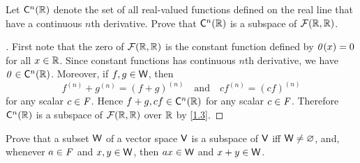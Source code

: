 \setcounter{ex}{15}
\begin{ex}\label{ex:1.3.16}
  Let \(\cfs[n](\R)\) denote the set of all real-valued functions defined on the real line that have a continuous \(n\)th derivative.
  Prove that \(\cfs[n](\R)\) is a subspace of \(\mathcal{F}(\mathbb{R}, \mathbb{R})\).
\end{ex}

\begin{proof}[]
  First note that the zero of \(\mathcal{F}(\mathbb{R}, \mathbb{R})\) is the constant function defined by \(\mathit{0}(x) = 0\) for all \(x \in \mathbb{R}\).
  Since constant functions has continuous \(n\)th derivative, we have \(\zv \in \cfs[n](\R)\).
  Moreover, if \(f, g \in \mathsf{W}\), then
  \[
    f^{(n)} + g^{(n)} = (f + g)^{(n)} \quad \text{and} \quad cf^{(n)} = (cf)^{(n)}
  \]
  for any scalar \(c \in \mathit{F}\).
  Hence \(f + g, cf \in \cfs[n](\R)\) for any scalar \(c \in \mathit{F}\).
  Therefore \(\cfs[n](\R)\) is a subspace of \(\mathcal{F}(\mathbb{R}, \mathbb{R})\) over \(\mathbb{R}\) by \cref{1.3}.
\end{proof}

\begin{ex}\label{ex:1.3.17}
  Prove that a subset \(\mathsf{W}\) of a vector space \(\mathsf{V}\) is a subspace of \(\mathsf{V}\) iff \(\mathsf{W} \neq \varnothing\), and, whenever \(a \in \mathit{F}\) and \(x, y \in \mathsf{W}\), then \(ax \in \mathsf{W}\) and \(x + y \in \mathsf{W}\).
\end{ex}

